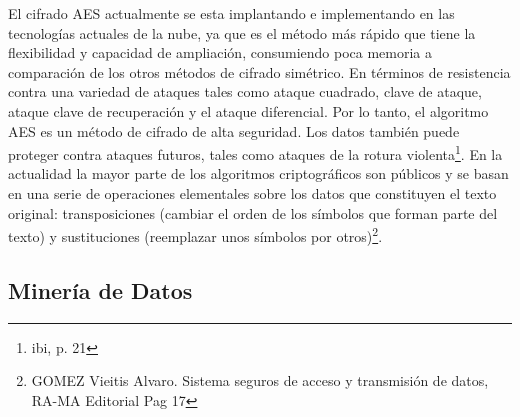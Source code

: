 \documentclass[a4paper,openright,12pt]{book}
\theoremstyle{definition}
\theoremstyle{remark}
\begin{document}
El cifrado AES actualmente se esta implantando e implementando en las tecnologías actuales de la nube, ya que es el método más rápido que tiene la flexibilidad y capacidad de ampliación, consumiendo poca memoria a comparación de los otros métodos de cifrado simétrico. En términos de resistencia contra una variedad de ataques tales como ataque cuadrado, clave de ataque, ataque clave de recuperación y el ataque diferencial. Por lo tanto, el algoritmo AES es un método de cifrado de alta seguridad. Los datos también puede proteger contra ataques futuros, tales como ataques de la rotura violenta\footnote{ibi, p. 21}. En la actualidad la mayor parte de los algoritmos criptográficos son públicos y se basan en una serie de operaciones elementales sobre los datos que constituyen el texto original: transposiciones (cambiar el orden de los símbolos que forman parte del texto) y sustituciones  (reemplazar unos símbolos por otros)\footnote{GOMEZ Vieitis Alvaro. Sistema seguros de acceso y transmisión de datos, RA-MA Editorial Pag 17}.

\subsection{Minería de Datos}
\end{document}
